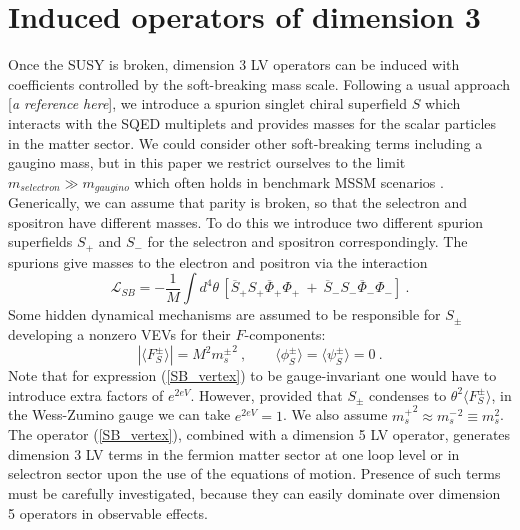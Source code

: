 \documentclass[12pt]{revtex4}
\begin{document}
\section{Induced operators of dimension 3}
\label{InducedDim3}

Once the SUSY is broken, dimension 3 LV operators can be induced 
with coefficients controlled by the soft-breaking mass scale. 
Following a usual approach [{\it a reference here}],
we introduce a spurion singlet
chiral superfield $ S $ which interacts with the SQED
multiplets and provides masses for the scalar particles
in the matter sector. We could consider other  
    soft-breaking terms including a gaugino mass, but in this paper we restrict
ourselves to the limit  $ m_{selectron} \gg m_{gaugino}$ which often holds in 
benchmark MSSM scenarios \cite{benchmark}.
Generically, we can assume that parity is broken, so that
the selectron and spositron have different masses.
To do this we introduce two different
spurion superfields $ S_+ $ and $ S_- $
for the selectron and spositron correspondingly.
The spurions give masses to the electron and positron
via the interaction
\begin{equation}
\label{SB_vertex}
  \mathcal{L}_{SB} = - \frac{1}{M} \int d^4\theta \, 
\left[\overline{S}_+ S_+ \overline{\Phi}_+ \Phi_+ 
~+~
\overline{S}_- S_- \overline{\Phi}_- \Phi_-
\right] 
~.
\end{equation}
Some hidden dynamical mechanisms are assumed to be responsible 
    for  $ S_\pm $ developing a 
nonzero VEVs for their $ F $-components:
\[
\left | \langle F^\pm_S \rangle \right | =
M^2 {m^\pm_{s}}^2~,\qquad 
\langle\phi_S^\pm\rangle = 
\langle\psi_S^\pm\rangle = 0~.
\]
Note that for expression (\ref{SB_vertex}) to be 
gauge-invariant one would have to introduce extra factors
of $ e^{2eV} $. 
However, provided that $ S_\pm $ condenses to 
$ \theta^2 \langle F^\pm_S \rangle $,
in the Wess-Zumino gauge we can take $e^{2eV}=1$.
We also assume 
$ {m_{s}^+}^2 \approx {m_{s}^-}^2 \equiv m_s^2 $.
The operator (\ref{SB_vertex}), 
combined with a dimension 5 LV operator,
generates dimension 3 LV terms in the fermion matter sector at one loop level or 
 in selectron sector upon the use 
    of the equations of motion. 
Presence of such terms must be carefully investigated, 
because  they can easily dominate over dimension 5 operators
in observable effects.
\end{document}
